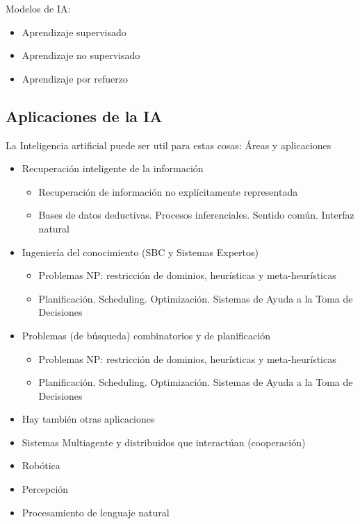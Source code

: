 {Modelos de IA:\ns
\begin{itemize}
	\item Aprendizaje supervisado
	\item Aprendizaje no supervisado
	\item Aprendizaje por refuerzo
\end{itemize}}

\subsection{Aplicaciones de la IA}
La Inteligencia artificial puede ser util para estas cosas:
Áreas y aplicaciones
\begin{itemize}
	\item Recuperación inteligente de la información
\begin{itemize}
	\item Recuperación de información no explícitamente representada
	\item Bases de datos deductivas. Procesos inferenciales. Sentido común. Interfaz natural
\end{itemize}
	\item Ingeniería del conocimiento (SBC y Sistemas Expertos)
\begin{itemize}
	\item Problemas NP: restricción de dominios, heurísticas y meta-heurísticas
	\item Planificación. Scheduling. Optimización. Sistemas de Ayuda a la Toma
de Decisiones

\end{itemize}
	\item Problemas (de búsqueda) combinatorios y de planificación
\begin{itemize}
	\item Problemas NP: restricción de dominios, heurísticas y meta-heurísticas
	\item Planificación. Scheduling. Optimización. Sistemas de Ayuda a la Toma
de Decisiones
\end{itemize}
\item[] Hay también otras aplicaciones
\item Sistemas Multiagente y distribuidos que interactúan (cooperación)
\item Robótica
\item Percepción
\item Procesamiento de lenguaje natural
\end{itemize}


